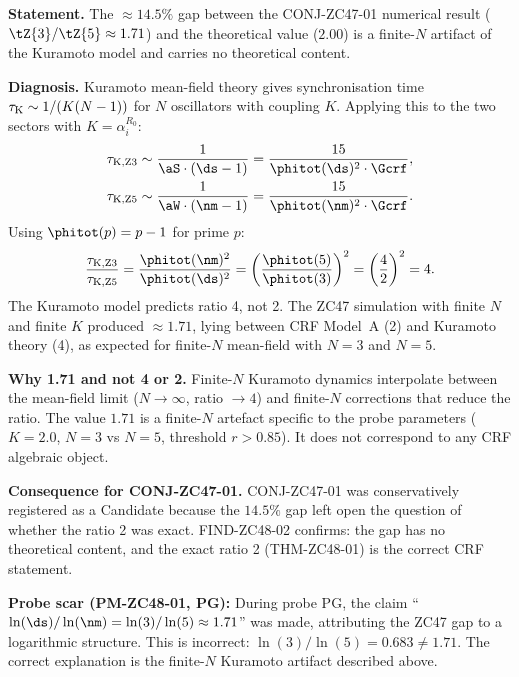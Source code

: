 \documentclass[12pt, a4paper]{article}
\begin{document}

\begin{derivedbox}[title={FIND-ZC48-02: ZC47 Gap is Finite-$N$
  Kuramoto Artifact}]
\textbf{Statement.}
The $\approx 14.5\%$ gap between the CONJ-ZC47-01 numerical
result ($\tZ{3}/\tZ{5} \approx 1.71$) and the theoretical
value ($2.00$) is a finite-$N$ artifact of the Kuramoto model
and carries no theoretical content.

\textbf{Diagnosis.}
Kuramoto mean-field theory gives synchronisation time
$\tau_{\rm K} \sim 1/(K(N-1))$ for $N$ oscillators
with coupling $K$.
Applying this to the two sectors with $K = \alpha_i^{R_0}$:
\begin{align*}
  \tau_{\rm K,Z3} &\sim \frac{1}{\aS \cdot (\ds-1)}
    = \frac{15}{\phitot(\ds)^2 \cdot \Gcrf},\\
  \tau_{\rm K,Z5} &\sim \frac{1}{\aW \cdot (\nm-1)}
    = \frac{15}{\phitot(\nm)^2 \cdot \Gcrf}.
\end{align*}
Using $\phitot(p) = p-1$ for prime $p$:
\[
  \frac{\tau_{\rm K,Z3}}{\tau_{\rm K,Z5}}
  = \frac{\phitot(\nm)^2}{\phitot(\ds)^2}
  = \left(\frac{\phitot(5)}{\phitot(3)}\right)^2
  = \left(\frac{4}{2}\right)^2 = 4.
\]
The Kuramoto model predicts ratio 4, not 2.
The ZC47 simulation with finite $N$ and finite $K$
produced $\approx 1.71$, lying between CRF Model~A (2)
and Kuramoto theory (4), as expected for finite-$N$
mean-field with $N = 3$ and $N = 5$.

\textbf{Why 1.71 and not 4 or 2.}
Finite-$N$ Kuramoto dynamics interpolate between the
mean-field limit ($N \to \infty$, ratio $\to 4$) and
finite-$N$ corrections that reduce the ratio.
The value $1.71$ is a finite-$N$ artefact specific to
the probe parameters ($K = 2.0$, $N = 3$ vs $N = 5$,
threshold $r > 0.85$).
It does not correspond to any CRF algebraic object.

\textbf{Consequence for CONJ-ZC47-01.}
CONJ-ZC47-01 was conservatively registered as a Candidate
because the $14.5\%$ gap left open the question of whether
the ratio 2 was exact.
FIND-ZC48-02 confirms: the gap has no theoretical content,
and the exact ratio 2 (THM-ZC48-01) is the correct CRF
statement.

\textbf{Probe scar (PM-ZC48-01, PG):}
During probe PG, the claim ``$\ln(\ds)/\ln(\nm)
= \ln(3)/\ln(5) \approx 1.71$'' was made, attributing
the ZC47 gap to a logarithmic structure.
This is incorrect: $\ln(3)/\ln(5) = 0.683 \neq 1.71$.
The correct explanation is the finite-$N$ Kuramoto artifact
described above.
\end{derivedbox}
\end{document}
